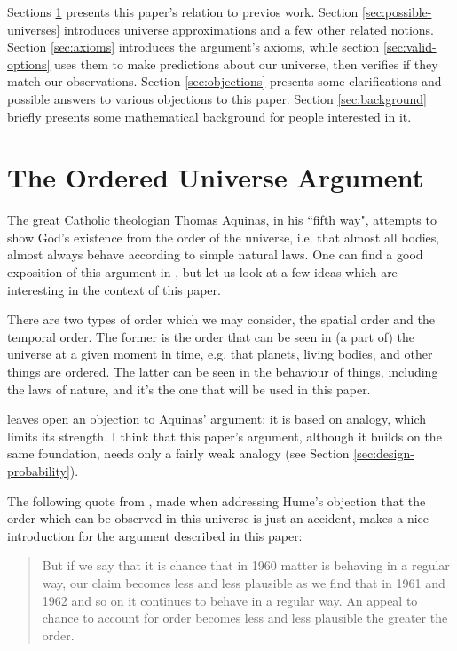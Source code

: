 \documentclass[a4paper
,draft
]{article}
\newcommand{\paper}[1]{paper}
\newcommand{\ghilimele}[1]{``#1"}
\begin{document}
Sections \ref{sec:ordered-universe} presents this paper's relation to
previos work.
Section \ref{sec:possible-universes} introduces universe approximations
and a few other related notions.
Section \ref{sec:axioms} introduces the argument's axioms,
while section \ref{sec:valid-options} uses them to make predictions
about our universe, then verifies if they match our observations.
Section \ref{sec:objections} presents some clarifications and possible
answers to various objections to this paper.
Section \ref{sec:background}
briefly presents some mathematical background for people interested in it.

\section{The Ordered Universe Argument}
\label{sec:ordered-universe}

The great Catholic theologian Thomas Aquinas,
in his \ghilimele{fifth way}, attempts to show God's existence from
the order of the universe, i.e. that almost all bodies, almost always
behave according to simple natural laws. %
One can find a good exposition of this argument in
\parencite{swinburne1968}, but let us look at a few ideas which are
interesting in the context of this \paper{}.

There are two types of order which we may consider, the spatial order
and the temporal order.
The former is the order that can be seen in (a part of) the universe
at a given moment in time, e.g. that planets, living bodies, and other things
are ordered.
The latter can be seen in the behaviour of things, including the laws of
nature, and it's the one that will be used in this \paper{}.

 leaves open an objection to Aquinas' argument:
it is based on analogy, which limits its strength.
I think that this \paper{}'s argument, although it builds on the same
foundation, needs only a fairly weak analogy
(see Section \ref{sec:design-probability}).

The following quote from \textcite{swinburne1968}, made when addressing
Hume's objection that the order which can be observed in this universe
is just an accident, makes a nice introduction for the argument
described in this \paper{}:
\begin{quote}
But if we say that it is chance that in 1960 matter is behaving in a
regular way, our claim becomes less and less plausible as we find that in
1961 and 1962 and so on it continues to behave in a regular way. An appeal
to chance to account for order becomes less and less plausible
the greater the order.
\end{quote}
\end{document}
